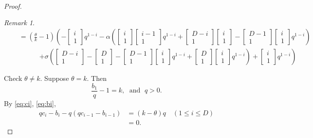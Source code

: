 \documentclass[
]{book}
\theoremstyle{definition}
\theoremstyle{definition}
\theoremstyle{definition}
\theoremstyle{definition}
\theoremstyle{remark}
\newtheorem*{remark}{Remark}
\begin{document}
\begin{proof}
\begin{remark}
\begin{align}
& \quad = \left(\frac{\theta}{k}-1\right)\left(-\begin{bmatrix}{i}\\{1}\end{bmatrix}q^{1-i}-\alpha\left(\begin{bmatrix}{i}\\{1}\end{bmatrix}\begin{bmatrix}{i-1}\\{1}\end{bmatrix}q^{1-i}+\begin{bmatrix}{D-i}\\{1}\end{bmatrix}\begin{bmatrix}{i}\\{1}\end{bmatrix}-\begin{bmatrix}{D-1}\\{1}\end{bmatrix}\begin{bmatrix}{i}\\{1}\end{bmatrix}q^{1-i}\right)\right.\\
&  \qquad\qquad \left.+\sigma\left(\begin{bmatrix}{D-i}\\{1}\end{bmatrix}-\begin{bmatrix}{D}\\{1}\end{bmatrix}-\begin{bmatrix}{D-1}\\{1}\end{bmatrix}\begin{bmatrix}{i}\\{1}\end{bmatrix}q^{1-i}+\begin{bmatrix}{D}\\{1}\end{bmatrix}\begin{bmatrix}{i}\\{1}\end{bmatrix}q^{1-i}\right)+\begin{bmatrix}{i}\\{1}\end{bmatrix}q^{1-i}\right)
\end{align}
\end{remark}

Check \(\theta\neq k\). Suppose \(\theta = k\). Then
\[\frac{b_1}{q}-1 = k, \; \text{ and }\; q>0.\]
By \eqref{eq:ci}, \eqref{eq:bi},
\begin{align}
qc_i - b_i - q(qc_{i-1}-b_{i-1}) & = (k-\theta)q \quad (1\leq i\leq D)\\
& = 0.
\end{align}


\end{proof}
\end{document}
